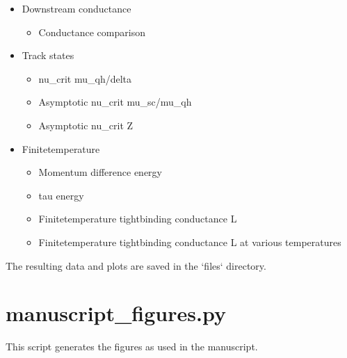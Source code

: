 \documentclass[letterpaper,10pt,english]{sphinxmanual}
\begin{document}
\begin{itemize}
\begin{itemize}
\end{itemize}

\item {} 
\sphinxAtStartPar
Downstream conductance
\begin{itemize}
\item {} 
\sphinxAtStartPar
Conductance comparison

\end{itemize}

\item {} 
\sphinxAtStartPar
Track states
\begin{itemize}
\item {} 
\sphinxAtStartPar
nu\_crit  mu\_qh/delta

\item {} 
\sphinxAtStartPar
Asymptotic nu\_crit  mu\_sc/mu\_qh

\item {} 
\sphinxAtStartPar
Asymptotic nu\_crit  Z

\end{itemize}

\item {} 
\sphinxAtStartPar
Finite\sphinxhyphen{}temperature
\begin{itemize}
\item {} 
\sphinxAtStartPar
Momentum difference  energy

\item {} 
\sphinxAtStartPar
tau  energy

\item {} 
\sphinxAtStartPar
Finite\sphinxhyphen{}temperature tight\sphinxhyphen{}binding conductance  L

\item {} 
\sphinxAtStartPar
Finite\sphinxhyphen{}temperature tight\sphinxhyphen{}binding conductance  L at various temperatures

\end{itemize}

\end{itemize}

\sphinxAtStartPar
The resulting data and plots are saved in the ‘files‘ directory.


\section{manuscript\_figures.py}
\label{\detokenize{main_scripts:module-manuscript_figures}}\label{\detokenize{main_scripts:manuscript-figures-py}}
\sphinxAtStartPar
This script generates the figures as used in the manuscript.
\end{document}
